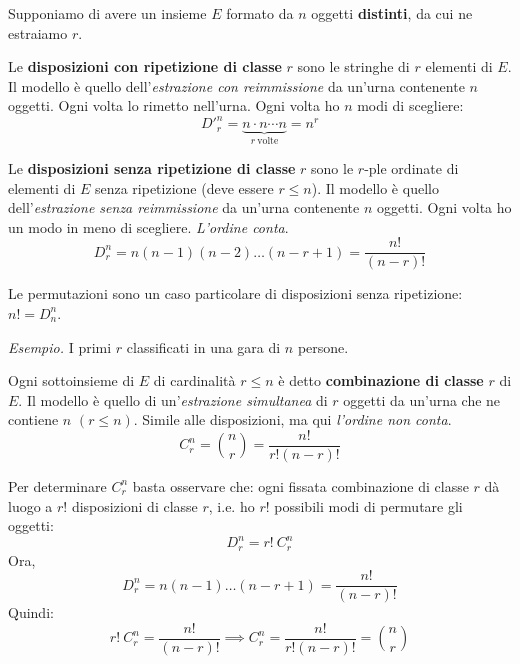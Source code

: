 Supponiamo di avere un insieme $E$ formato da $n$ oggetti \textbf{distinti}, da cui ne estraiamo $r$.
\begin{definition}
Le \textbf{disposizioni con ripetizione di classe }$r$ sono le stringhe di $r$ elementi di $E$. Il modello è quello dell'\textit{estrazione con reimmissione} da un'urna contenente $n$ oggetti. Ogni volta lo rimetto nell'urna. Ogni volta ho $n$ modi di scegliere:
\begin{equation*}
\boxed{D'^{n}_{r} =\underbrace{n\cdot n\cdots n}_{r\ \text{volte}} =n^{r}}
\end{equation*}
\end{definition}
\begin{definition}
Le \textbf{disposizioni senza ripetizione di classe} $r$ sono le $r$-ple ordinate di elementi di $E$ senza ripetizione (deve essere $r\leq n$). Il modello è quello dell'\textit{estrazione senza reimmissione} da un'urna contenente $n$ oggetti. Ogni volta ho un modo in meno di scegliere. \textit{L'ordine conta}.
\begin{equation*}
\boxed{D_{r}^{n} =n( n-1)( n-2) \dotsc ( n-r+1) =\frac{n!}{( n-r) !}}
\end{equation*}
\end{definition}
\begin{oss}
Le permutazioni sono un caso particolare di disposizioni senza ripetizione: $n!=D_{n}^{n}$.
\end{oss}
\textit{Esempio.} I primi $r$ classificati in una gara di $n$ persone.

\begin{definition}
Ogni sottoinsieme di $E$ di cardinalità $r\leq n$ è detto \textbf{combinazione di classe} $r$ di $E$. Il modello è quello di un'\textit{estrazione simultanea} di $r$ oggetti da un'urna che ne contiene $n$ $( r\leq n)$. Simile alle disposizioni, ma qui \textit{l'ordine non conta}.
\begin{equation*}
\boxed{C_{r}^{n} =\binom{n}{r} =\frac{n!}{r!( n-r) !}}
\end{equation*}
\end{definition}
\begin{oss}
Per determinare $C_{r}^{n}$ basta osservare che: ogni fissata combinazione di classe $r$ dà luogo a $r!$ disposizioni di classe $r$, i.e. ho $r!$ possibili modi di permutare gli oggetti:
\begin{equation*}
D_{r}^{n} =r!\ C_{r}^{n}
\end{equation*}
Ora,
\begin{equation*}
D_{r}^{n} =n( n-1) \dotsc ( n-r+1) =\frac{n!}{( n-r) !}
\end{equation*}
Quindi:
\begin{equation*}
r!\ C_{r}^{n} =\frac{n!}{( n-r) !} \implies C_{r}^{n} =\frac{n!}{r!( n-r) !} =\binom{n}{r}
\end{equation*}
\end{oss}
\Esercizio{}

